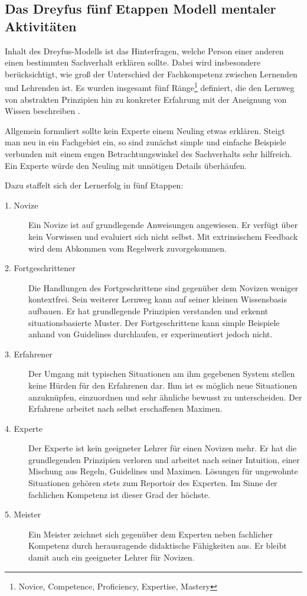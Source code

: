 \subsection{Das Dreyfus fünf Etappen Modell mentaler
Aktivitäten}\label{ref:dreyfus}
Inhalt des Dreyfus-Modells ist das Hinterfragen, welche Person einer anderen
einen bestimmten Sachverhalt erklären sollte. Dabei wird insbesondere
berücksichtigt, wie groß der Unterschied der Fachkompetenz zwischen Lernenden
und Lehrenden ist. Es wurden insgesamt fünf Ränge\footnote{Novice, Competence,
Proficiency, Expertise, Mastery} definiert, die den Lernweg von abstrakten
Prinzipien hin zu konkreter Erfahrung mit der Aneignung von Wissen beschreiben
\cite{dreyfus:1980}.

Allgemein formuliert sollte kein Experte einem Neuling etwas erklären. Steigt
man neu in ein Fachgebiet ein, so sind zunächst simple und einfache Beispiele
verbunden mit einem engen Betrachtungswinkel des Sachverhalts sehr hilfreich.
Ein Experte würde den Neuling mit unnötigen Details überhäufen.

Dazu staffelt sich der Lernerfolg in fünf Etappen:
\begin{description}
  \item[1. Novize] Ein Novize ist auf grundlegende Anweisungen angewiesen. Er
  verfügt über kein Vorwissen und evaluiert sich nicht selbst. Mit extrinsischem
  Feedback wird dem Abkommen vom Regelwerk zuvorgekommen.
  \item[2. Fortgeschrittener] Die Handlungen des Fortgeschrittene sind gegenüber
  dem Novizen weniger kontextfrei. Sein weiterer Lernweg kann auf seiner kleinen
  Wissensbasis aufbauen. Er hat grundlegende Prinzipien verstanden und erkennt
  situationsbasierte Muster. Der Fortgeschrittene kann simple Beispiele anhand
  von Guidelines durchlaufen, er experimentiert jedoch nicht.
  \item[3. Erfahrener] Der Umgang mit typischen Situationen am ihm gegebenen
  System stellen keine Hürden für den Erfahrenen dar. Ihm ist es möglich neue
  Situationen anzuknüpfen, einzuordnen und sehr ähnliche bewusst zu
  unterscheiden. Der Erfahrene arbeitet nach selbst erschaffenen Maximen.
  \item[4. Experte] Der Experte ist kein geeigneter Lehrer für einen Novizen
  mehr. Er hat die grundlegenden Prinzipien verloren und arbeitet nach seiner
  Intuition, einer Mischung aus Regeln, Guidelines und Maximen. Lösungen für
  ungewohnte Situationen gehören stets zum Reportoir des Experten. Im Sinne der
  fachlichen Kompetenz ist dieser Grad der höchste.
  \item[5. Meister] Ein Meister zeichnet sich gegenüber dem Experten neben
  fachlicher Kompetenz durch herausragende didaktische Fähigkeiten aus. Er
  bleibt damit auch ein geeigneter Lehrer für Novizen.
\end{description}

